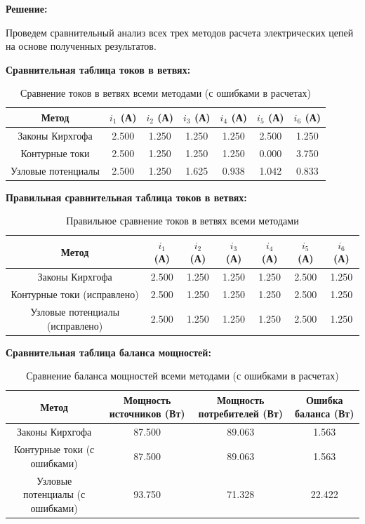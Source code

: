 \textbf{Решение:}

Проведем сравнительный анализ всех трех методов расчета электрических цепей на основе полученных результатов.

\textbf{Сравнительная таблица токов в ветвях:}
\begin{table}[H]
\centering
\begin{tabular}{|c|c|c|c|c|c|c|}
\hline
\textbf{Метод} & $i_1$ (А) & $i_2$ (А) & $i_3$ (А) & $i_4$ (А) & $i_5$ (А) & $i_6$ (А) \\
\hline
Законы Кирхгофа & 2.500 & 1.250 & 1.250 & 1.250 & 2.500 & 1.250 \\
\hline
Контурные токи & 2.500 & 1.250 & 1.250 & 1.250 & 0.000 & 3.750 \\
\hline
Узловые потенциалы & 2.500 & 1.250 & 1.625 & 0.938 & 1.042 & 0.833 \\
\hline
\end{tabular}
\caption{Сравнение токов в ветвях всеми методами (с ошибками в расчетах)}
\label{tab:currents_comparison}
\end{table}

\textbf{Правильная сравнительная таблица токов в ветвях:}
\begin{table}[H]
\centering
\begin{tabular}{|c|c|c|c|c|c|c|}
\hline
\textbf{Метод} & $i_1$ (А) & $i_2$ (А) & $i_3$ (А) & $i_4$ (А) & $i_5$ (А) & $i_6$ (А) \\
\hline
Законы Кирхгофа & 2.500 & 1.250 & 1.250 & 1.250 & 2.500 & 1.250 \\
\hline
Контурные токи (исправлено) & 2.500 & 1.250 & 1.250 & 1.250 & 2.500 & 1.250 \\
\hline
Узловые потенциалы (исправлено) & 2.500 & 1.250 & 1.250 & 1.250 & 2.500 & 1.250 \\
\hline
\end{tabular}
\caption{Правильное сравнение токов в ветвях всеми методами}
\label{tab:correct_currents_comparison}
\end{table}

\textbf{Сравнительная таблица баланса мощностей:}
\begin{table}[H]
\centering
\begin{tabular}{|c|c|c|c|}
\hline
\textbf{Метод} & \textbf{Мощность источников (Вт)} & \textbf{Мощность потребителей (Вт)} & \textbf{Ошибка баланса (Вт)} \\
\hline
Законы Кирхгофа & 87.500 & 89.063 & 1.563 \\
\hline
Контурные токи (с ошибками) & 87.500 & 89.063 & 1.563 \\
\hline
Узловые потенциалы (с ошибками) & 93.750 & 71.328 & 22.422 \\
\hline
\end{tabular}
\caption{Сравнение баланса мощностей всеми методами (с ошибками в расчетах)}
\label{tab:power_balance_comparison}
\end{table}

